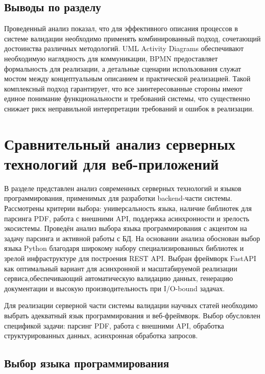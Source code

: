 \subsection{Выводы по разделу}
Проведенный анализ показал, что для эффективного описания процессов в системе валидации 
необходимо применять комбинированный подход, сочетающий достоинства различных методологий.
UML Activity Diagrams обеспечивают необходимую наглядность для коммуникации, 
BPMN предоставляет формальность для реализации, а детальные сценарии
использования служат мостом между концептуальным описанием и практической реализацией. 
Такой комплексный подход гарантирует, что все заинтересованные стороны имеют
единое понимание функциональности и требований системы, что существенно снижает риск
неправильной интерпретации требований и ошибок в реализации.


\section{Сравнительный анализ серверных технологий для веб-приложений}
\begin{annotation}
	В разделе представлен анализ современных серверных технологий и языков
	программирования, применимых для разработки backend-части системы. Рассмотрены критерии 
	выбора: универсальность языка, наличие библиотек для парсинга PDF, работа с
	внешними API, поддержка асинхронности и зрелость экосистемы. Проведён анализ выбора 
	языка программирования с акцентом на задачу парсинга и активной работы с БД. На
	основании анализа обоснован выбор языка Python благодаря широкому набору специализированных
	библиотек и зрелой инфраструктуре для построения REST API. Выбран фреймворк 
	FastAPI как оптимальный вариант для асинхронной и масштабируемой реализации
	сервиса,обеспечивающий автоматическую валидацию данных, генерацию документации и
	высокую производительность при I/O-bound задачах.
\end{annotation}

Для реализации серверной части системы валидации научных статей необходимо выбрать
адекватный язык программирования и веб-фреймворк. Выбор обусловлен спецификой задачи:
парсинг PDF, работа с внешними API, обработка структурированных данных,
асинхронная обработка запросов.

\subsection{Выбор языка программирования}

